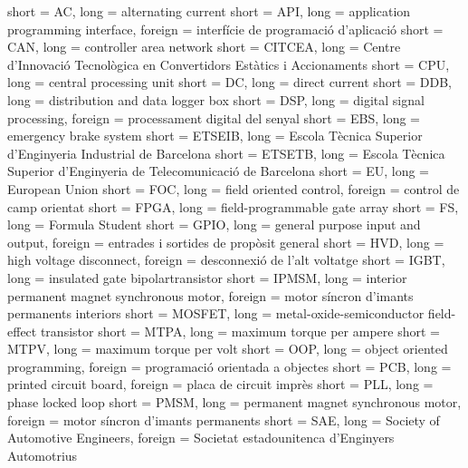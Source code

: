      { short = AC,      long = alternating current }
    { short = API,     long = application programming interface, foreign = interfície de programació d'aplicació }
    { short = CAN,     long = controller area network }
 { short = CITCEA,  long = Centre d'Innovació Tecnològica en Convertidors Estàtics i Accionaments }
    { short = CPU,     long = central processing unit }
     { short = DC,      long = direct current }
    { short = DDB,     long = distribution and data logger box }
    { short = DSP,     long = digital signal processing, foreign = processament digital del senyal }
    { short = EBS,     long = emergency brake system }
 { short = ETSEIB,  long = Escola Tècnica Superior d'Enginyeria Industrial de Barcelona }
 { short = ETSETB,  long = Escola Tècnica Superior d'Enginyeria de Telecomunicació de Barcelona }
     { short = EU,      long = European Union }
    { short = FOC,     long = field oriented control, foreign = control de camp orientat }
   { short = FPGA,    long = field-programmable gate array }
     { short = FS,      long = Formula Student }
   { short = GPIO,    long = general purpose input and output, foreign = entrades i sortides de propòsit general}
    { short = HVD,     long = high voltage disconnect, foreign = desconnexió de l'alt voltatge}
   { short = IGBT,    long = insulated gate bipolartransistor }
  { short = IPMSM,   long = interior permanent magnet synchronous motor, foreign = motor síncron d'imants permanents interiors }
 { short = MOSFET,  long = metal-oxide-semiconductor field-effect transistor }
   { short = MTPA,    long = maximum torque per ampere }
   { short = MTPV,    long = maximum torque per volt }
    { short = OOP,     long = object oriented programming, foreign = programació orientada a objectes}
    { short = PCB,     long = printed circuit board, foreign = placa de circuit imprès }
    { short = PLL,     long = phase locked loop }
   { short = PMSM,    long = permanent magnet synchronous motor, foreign = motor síncron d'imants permanents }
    { short = SAE,     long = Society of Automotive Engineers, foreign = {Societat estadounitenca d'Enginyers Automotrius} }
